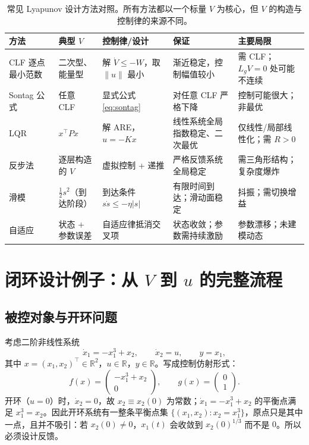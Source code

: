 \documentclass[11pt, a4paper, UTF8, fontset=none]{ctexart}
\theoremstyle{cnthm}
\newcommand{\R}{\mathbb{R}}
\newcommand{\norm}[1]{\lVert #1\rVert}
\newcommand{\abs}[1]{\lvert #1\rvert}
\newcommand{\Lg}{L_g}
\begin{document}
\begin{table}[H]
\centering
\small
\begin{tabularx}{\textwidth}{@{}>{\raggedright\arraybackslash}p{2.1cm}>{\raggedright\arraybackslash}p{3.0cm}>{\raggedright\arraybackslash}p{3.4cm}>{\raggedright\arraybackslash}p{3.1cm}X@{}}
\toprule
方法 & 典型 $V$ & 控制律/设计 & 保证 & 主要局限 \\
\midrule
CLF 逐点最小范数 & 二次型、能量型 & 解 $\dot V\le-W$，取 $\norm{u}$ 最小 & 渐近稳定，控制幅值较小 & 需 CLF；$\Lg V=0$ 处可能不连续 \\
Sontag 公式 & 任意 CLF & 显式公式 \eqref{eq:sontag} & 对任意 CLF 严格下降 & 控制可能很大；非最优 \\
LQR & $x^\top Px$ & 解 ARE，$u=-Kx$ & 线性系统全局指数稳定、二次最优 & 仅线性/局部线性化；需 $R>0$ \\
反步法 & 逐层构造的 $V$ & 虚拟控制 + 递推 & 严格反馈系统全局稳定 & 需三角形结构；复杂度爆炸 \\
滑模 & $\frac12s^2$（到达阶段） & 到达条件 $s\dot s\le-\eta\abs{s}$ & 有限时间到达；滑动面稳定 & 抖振；需切换增益 \\
自适应 & 状态 + 参数误差 & 自适应律抵消交叉项 & 状态收敛；参数需持续激励 & 参数漂移；未建模动态 \\
\bottomrule
\end{tabularx}
\caption{常见 Lyapunov 设计方法对照。所有方法都以一个标量 $V$ 为核心，但 $V$ 的构造与控制律的来源不同。}
\label{tab:methods}
\end{table}

\section{闭环设计例子：从 \texorpdfstring{$V$}{V} 到 \texorpdfstring{$u$}{u} 的完整流程}
\label{sec:example}

\subsection{被控对象与开环问题}

考虑二阶非线性系统
\begin{equation}
  \dot x_1=-x_1^3+x_2,\qquad \dot x_2=u,\qquad y=x_1,
  \label{eq:example-plant}
\end{equation}
其中 $x=(x_1,x_2)^\top\in\R^2$，$u\in\R$，$y\in\R$。写成控制仿射形式：
\begin{equation}
  f(x)=\begin{pmatrix}-x_1^3+x_2\\0\end{pmatrix},\qquad
  g(x)=\begin{pmatrix}0\\1\end{pmatrix}.
\end{equation}
开环（$u=0$）时，$\dot x_2=0$，故 $x_2\equiv x_2(0)$ 为常数；$\dot x_1=-x_1^3+x_2$ 的平衡点满足 $x_1^3=x_2$。因此开环系统有一整条平衡点集 $\{(x_1,x_2):x_2=x_1^3\}$，原点只是其中一点，且并不吸引：若 $x_2(0)\ne0$，$x_1(t)$ 会收敛到 $x_2(0)^{1/3}$ 而不是 $0$。所以必须设计反馈。
\end{document}
